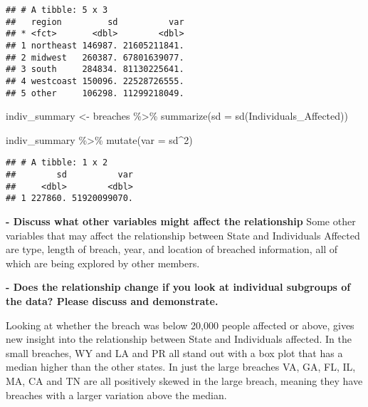 \documentclass[
]{article}
\newenvironment{Shaded}{\begin{snugshade}}{\end{snugshade}}
\newcommand{\AttributeTok}[1]{\textcolor[rgb]{0.77,0.63,0.00}{#1}}
\newcommand{\DecValTok}[1]{\textcolor[rgb]{0.00,0.00,0.81}{#1}}
\newcommand{\FunctionTok}[1]{\textcolor[rgb]{0.00,0.00,0.00}{#1}}
\newcommand{\NormalTok}[1]{#1}
\newcommand{\OtherTok}[1]{\textcolor[rgb]{0.56,0.35,0.01}{#1}}
\newcommand{\SpecialCharTok}[1]{\textcolor[rgb]{0.00,0.00,0.00}{#1}}
\begin{document}
\begin{verbatim}
## # A tibble: 5 x 3
##   region         sd          var
## * <fct>       <dbl>        <dbl>
## 1 northeast 146987. 21605211841.
## 2 midwest   260387. 67801639077.
## 3 south     284834. 81130225641.
## 4 westcoast 150096. 22528726555.
## 5 other     106298. 11299218049.
\end{verbatim}

\begin{Shaded}
\begin{Highlighting}[]
\NormalTok{indiv\_summary }\OtherTok{\textless{}{-}}\NormalTok{ breaches }\SpecialCharTok{\%\textgreater{}\%}
  \FunctionTok{summarize}\NormalTok{(}\AttributeTok{sd =} \FunctionTok{sd}\NormalTok{(Individuals\_Affected))}

\NormalTok{indiv\_summary }\SpecialCharTok{\%\textgreater{}\%}
  \FunctionTok{mutate}\NormalTok{(}\AttributeTok{var =}\NormalTok{ sd}\SpecialCharTok{\^{}}\DecValTok{2}\NormalTok{)}
\end{Highlighting}
\end{Shaded}

\begin{verbatim}
## # A tibble: 1 x 2
##        sd          var
##     <dbl>        <dbl>
## 1 227860. 51920099070.
\end{verbatim}

\textbf{- Discuss what other variables might affect the relationship}
Some other variables that may affect the relationship between State and
Individuals Affected are type, length of breach, year, and location of
breached information, all of which are being explored by other members.

\textbf{- Does the relationship change if you look at individual
subgroups of the data? Please discuss and demonstrate.}

Looking at whether the breach was below 20,000 people affected or above,
gives new insight into the relationship between State and Individuals
affected. In the small breaches, WY and LA and PR all stand out with a
box plot that has a median higher than the other states. In just the
large breaches VA, GA, FL, IL, MA, CA and TN are all positively skewed
in the large breach, meaning they have breaches with a larger variation
above the median.
\end{document}
